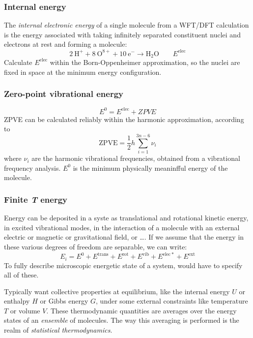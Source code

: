 \documentclass[11pt]{article}
\begin{document}
\subsubsection{Internal energy}
\label{sec:orgf55d67c}
The \emph{internal electronic energy} of a single molecule from a WFT/DFT calculation is the energy
associated with taking infinitely separated constituent nuclei and electrons at
rest and forming a molecule:
\begin{equation}
2~\mathrm{H}^+ + 8~\mathrm{O}^{8+} + 10~\mathrm{e}^- \rightarrow
\mathrm{H_2O}\qquad E^\mathrm{elec}
\end{equation}
Calculate \(E^\mathrm{elec}\)  within the Born-Oppenheimer
approximation, so the nuclei are fixed in space
at the minimum energy configuration.  
\subsubsection{Zero-point vibrational energy}
\label{sec:org7c982ff}
\begin{equation}
  E^0=E^\mathrm{elec} + ZPVE
\end{equation}
ZPVE can be calculated reliably within the harmonic approximation, according to
\begin{equation}
  \mathrm{ZPVE}=\frac{1}{2}h\sum_{i=1}^{3n-6}\nu_i
\end{equation}
where \(\nu_i\) are the harmonic vibrational frequencies, obtained from a
vibrational frequency analysis.  \(E^0\) is the minimum physically meaninfful
energy of the molecule.
\subsubsection{Finite \emph{T} energy}
\label{sec:orgc10bf97}
Energy can be deposited in a syste  as
translational and rotational kinetic energy, in excited vibrational modes, in
the interaction of a molecule with an external electric or magnetic or
gravitational field, or \ldots{}.   If we assume that the energy in these various
degrees of freedom are separable, we can write:
\begin{equation}
  E_i=E^0+E^\mathrm{trans}+E^\mathrm{rot}+E^\mathrm{vib} +E^\mathrm{elec*}+E^\mathrm{ext}
\end{equation}
To fully describe microscopic energetic state of a system, would have to
specify all of these.

Typically want collective properties at equilibrium, like the internal
energy \(U\) or enthalpy \(H\) or Gibbs energy \(G\), under some external
constraints like temperature \(T\) or volume \(V\).  These thermodynamic
quantities are averages over the energy states of an \emph{ensemble} of
molecules.  The way this averaging is performed is the realm of
\emph{statistical thermodynamics}.
\end{document}
